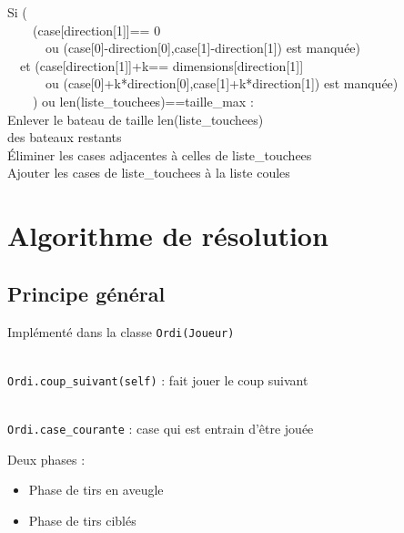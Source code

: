 {\begin{frame}[allowframebreaks]
\framebreak
{}Si (\\
\ \ \ \ (case[direction[1]]== 0 \\
\ \ \ \ \ \ ou (case[0]-direction[0],case[1]-direction[1]) est manquée)\\
\ \ et (case[direction[1]]+k== dimensions[direction[1]] \\
\ \ \ \ \ \ ou (case[0]+k*direction[0],case[1]+k*direction[1]) est manquée)\\
\ \ \ \ ) ou len(liste\_touchees)==taille\_max :\\
Enlever le bateau de taille len(liste\_touchees)\\
des bateaux restants\\
Éliminer les cases adjacentes à celles de liste\_touchees\\
Ajouter les cases de liste\_touchees à la liste coules\\
\end{frame}
}

\section{Algorithme de résolution}
\subsection{Principe général}
\begin{frame}
Implémenté dans la classe \texttt{Ordi(Joueur)}\\~\\ \pause

\texttt{Ordi.coup\_suivant(self)} : fait jouer le coup suivant\\~\\ \pause

 \texttt{Ordi.case\_courante} : case qui est entrain d'être jouée
\end{frame}

\begin{frame}
Deux phases :\pause
\begin{itemize}
\item Phase de tirs en aveugle\pause
\item Phase de tirs ciblés
\end{itemize}
\end{frame}

